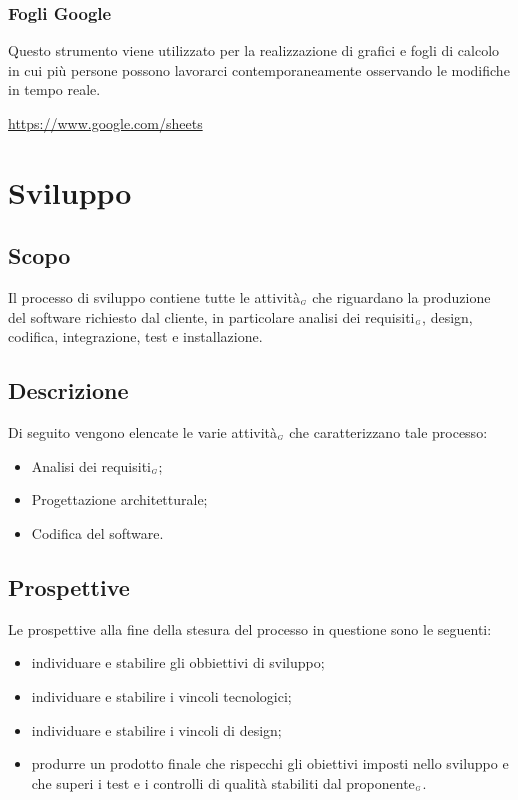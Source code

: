 \subsubsection{Fogli Google}\label{ProcessiPrimariFornituraStrumentiFogliGoogle}
Questo strumento viene utilizzato per la realizzazione di grafici e fogli di calcolo in cui più persone possono lavorarci contemporaneamente osservando le modifiche in tempo reale.
\begin{center}
	\url{https://www.google.com/sheets}
\end{center}


\section{Sviluppo}\label{ProcessiPrimariSviluppo}
\subsection{Scopo}\label{ProcessiPrimariScopo}
Il processo di sviluppo contiene tutte le attività$_{\scaleto{G}{3pt}}$ che riguardano la produzione del software richiesto dal cliente, in particolare analisi dei requisiti$_{\scaleto{G}{3pt}}$, design, codifica, integrazione, test e installazione.
\subsection{Descrizione}\label{ProcessiPrimariDescrizione}
Di seguito vengono elencate le varie attività$_{\scaleto{G}{3pt}}$ che caratterizzano tale processo:
\begin{itemize}
	\item Analisi dei requisiti$_{\scaleto{G}{3pt}}$;
	\item Progettazione architetturale;
	\item Codifica del software.
\end{itemize}
\subsection{Prospettive}\label{ProcessiPrimariProspettive}
Le prospettive alla fine della stesura del processo in questione sono le seguenti:
\begin{itemize}
	\item individuare e stabilire gli obbiettivi di sviluppo;
	\item individuare e stabilire i vincoli tecnologici;
	\item individuare e stabilire i vincoli di design;
	\item produrre un prodotto finale che rispecchi gli obiettivi imposti nello sviluppo e che superi i test e i controlli di qualità stabiliti dal proponente$_{\scaleto{G}{3pt}}$.
\end{itemize}
